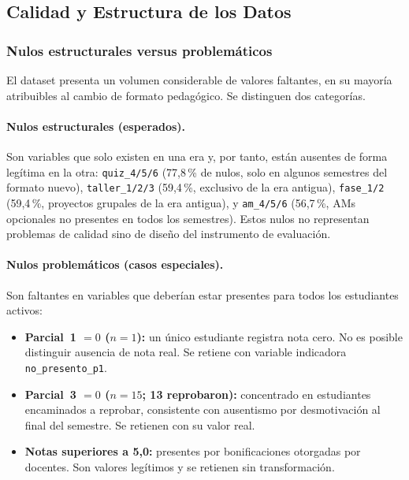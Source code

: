 \subsection{Calidad y Estructura de los Datos}
\label{subsec:calidad}

\subsubsection{Nulos estructurales versus problemáticos}
\label{sssec:nulos}

El dataset presenta un volumen considerable de valores faltantes,
en su mayoría atribuibles al cambio de formato pedagógico.
Se distinguen dos categorías.

\paragraph{Nulos estructurales (esperados).}
Son variables que solo existen en una era y, por tanto, están
ausentes de forma legítima en la otra:
\texttt{quiz\_4/5/6} (77,8\,\% de nulos, solo en algunos
semestres del formato nuevo),
\texttt{taller\_1/2/3} (59,4\,\%, exclusivo de la era antigua),
\texttt{fase\_1/2} (59,4\,\%, proyectos grupales de la era antigua),
y \texttt{am\_4/5/6} (56,7\,\%, AMs opcionales no presentes en
todos los semestres). Estos nulos no representan problemas de
calidad sino de diseño del instrumento de evaluación.

\paragraph{Nulos problemáticos (casos especiales).}
Son faltantes en variables que deberían estar presentes para
todos los estudiantes activos:
\begin{itemize}
  \item \textbf{Parcial~1 $= 0$ ($n = 1$):} un único estudiante
    registra nota cero. No es posible distinguir ausencia de nota
    real. Se retiene con variable indicadora
    \texttt{no\_presento\_p1}.
  \item \textbf{Parcial~3 $= 0$ ($n = 15$; 13 reprobaron):}
    concentrado en estudiantes encaminados a reprobar, consistente
    con ausentismo por desmotivación al final del semestre.
    Se retienen con su valor real.
  \item \textbf{Notas superiores a 5{,}0:} presentes por
    bonificaciones otorgadas por docentes. Son valores legítimos
    y se retienen sin transformación.
\end{itemize}

